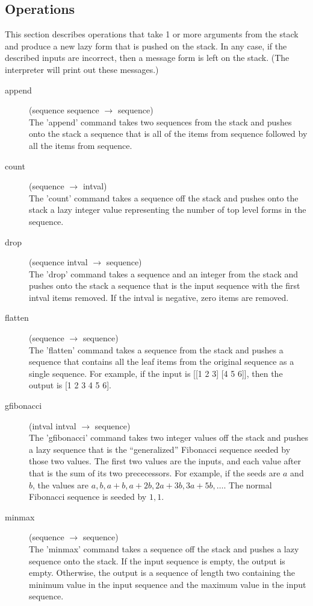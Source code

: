 \documentclass[12pt]{article}
\newcommand{\stackcmd}[3]{\item[{#1}] \hfill ({#2} $\rightarrow{}$ {#3}) \\}
\begin{document}
\subsection*{Operations}

This section describes operations that take 1 or more arguments from
the stack and produce a new lazy form that is pushed on the stack.
In any case, if the described inputs are incorrect, then a message
form is left on the stack.  (The interpreter will print out these
messages.)


\begin{description}

\stackcmd{append}{sequence sequence}{sequence}  The 'append'
command takes two sequences from the stack and pushes onto the stack a
sequence that is all of the items from sequence followed by all the
items from sequence. 

\stackcmd{count}{sequence}{intval}  The 'count' command takes a
sequence off the stack and pushes onto the stack a lazy integer value
representing the number of top level forms in the sequence.

\stackcmd{drop}{sequence intval}{sequence}  The 'drop' command takes a
sequence and an integer from the stack and pushes onto the stack a
sequence that is the input sequence with the first intval items
removed.  If the intval is negative, zero items are removed.

\stackcmd{flatten}{sequence}{sequence}  The 'flatten' command takes a
sequence from the stack and pushes a sequence that contains all the
leaf items from the original sequence as a single sequence.  For
example, if the input is [[1 2 3] [4 5 6]], then the output is [1 2 3
4 5 6].

\stackcmd{gfibonacci}{intval intval}{sequence}  The 'gfibonacci'
command takes two integer values off the stack and pushes a lazy
sequence that is the ``generalized'' Fibonacci sequence seeded by
those two values.  The first two values are the inputs, and each value
after that is the sum of its two prececessors.  For example, if the
seeds are $a$ and $b$, the values are $a, b, a+b, a+2b, 2a+3b, 3a+5b,
\dots$.  The normal Fibonacci sequence is seeded by $1, 1$.

\stackcmd{minmax}{sequence}{sequence}  The 'minmax' command takes a
sequence off the stack and pushes a lazy sequence onto the stack.  If
the input sequence is empty, the output is empty.  Otherwise, the
output is a sequence of length two containing the minimum value in the
input sequence and the maximum value in the input sequence.


\end{description}
\end{document}
